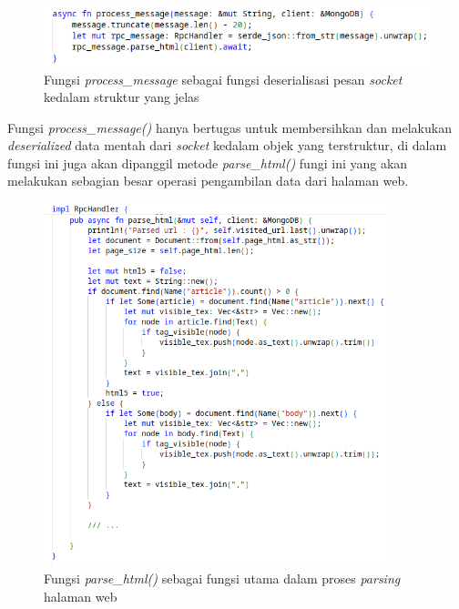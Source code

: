\begin{figure}[H]
  \centering
  \includegraphics[keepaspectratio, width=13cm]{gambar/parser-process-message-code.png}
  \caption{Fungsi \emph{process\_message} sebagai fungsi deserialisasi pesan \emph{socket} kedalam struktur yang jelas}
  \label{gambar:parser-process-message}
\end{figure}

Fungsi \emph{process\_message()} hanya bertugas untuk membersihkan dan melakukan \emph{deserialized} data mentah dari \emph{socket} kedalam objek yang terstruktur, di dalam fungsi ini juga akan dipanggil metode \emph{parse\_html()} fungi ini yang akan melakukan sebagian besar operasi pengambilan data dari halaman web.

\begin{figure}[H]
  \centering
  \includegraphics[keepaspectratio, width=10cm]{gambar/parse-html-body-text.png}
  \caption{Fungsi \emph{parse\_html()} sebagai fungsi utama dalam proses \emph{parsing} halaman web}
  \label{gambar:parse-html-body-text}
\end{figure}

